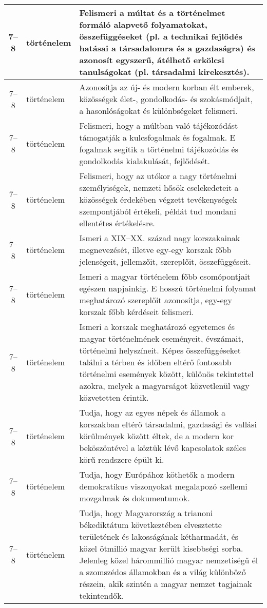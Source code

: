 \begin{small}
\begin{longtable}{c | p{2cm} |  p{11cm} }
              7--8 & történelem & Felismeri a múltat és a történelmet formáló alapvető folyamatokat, összefüggéseket (pl. a technikai fejlődés hatásai a társadalomra és a gazdaságra) és azonosít egyszerű, átélhető erkölcsi tanulságokat (pl. társadalmi kirekesztés). \\ \hline
              7--8 & történelem & Azonosítja az új- és modern korban élt emberek, közösségek élet-, gondolkodás- és szokásmódjait, a hasonlóságokat és különbségeket felismeri.
 \\ \hline
              7--8 & történelem & Felismeri, hogy a múltban való tájékozódást támogatják a kulcsfogalmak és fogalmak. E fogalmak segítik a történelmi tájékozódás és gondolkodás kialakulását, fejlődését. \\ \hline
              7--8 & történelem & Felismeri, hogy az utókor a nagy történelmi személyiségek, nemzeti hősök cselekedeteit a közösségek érdekében végzett tevékenységek szempontjából értékeli, példát tud mondani ellentétes értékelésre. \\ \hline
              7--8 & történelem & Ismeri a XIX--XX. század nagy korszakainak megnevezését, illetve egy-egy korszak főbb jelenségeit, jellemzőit, szereplőit, összefüggéseit. \\ \hline
              7--8 & történelem & Ismeri a magyar történelem főbb csomópontjait egészen napjainkig. E hosszú történelmi folyamat meghatározó szereplőit azonosítja, egy-egy korszak főbb kérdéseit felismeri. \\ \hline
              7--8 & történelem & Ismeri a korszak meghatározó egyetemes és magyar történelmének eseményeit, évszámait, történelmi helyszíneit. Képes összefüggéseket találni a térben és időben eltérő fontosabb történelmi események között, különös tekintettel azokra, melyek a magyarságot közvetlenül vagy közvetetten érintik. \\ \hline
              7--8 & történelem & Tudja, hogy az egyes népek és államok a korszakban eltérő társadalmi, gazdasági és vallási körülmények között éltek, de a modern kor beköszöntével a köztük lévő kapcsolatok széles körű rendszere épült ki. \\ \hline
              7--8 & történelem & Tudja, hogy Európához köthetők a modern demokratikus viszonyokat megalapozó szellemi mozgalmak és dokumentumok. \\ \hline
              7--8 & történelem & Tudja, hogy Magyarország a trianoni békediktátum következtében elvesztette területének és lakosságának kétharmadát, és közel ötmillió magyar került kisebbségi sorba. Jelenleg közel hárommillió magyar nemzetiségű él a szomszédos államokban és a világ különböző részein, akik szintén a magyar nemzet tagjainak tekintendők. \\ \hline

\end{longtable}
\end{small}
